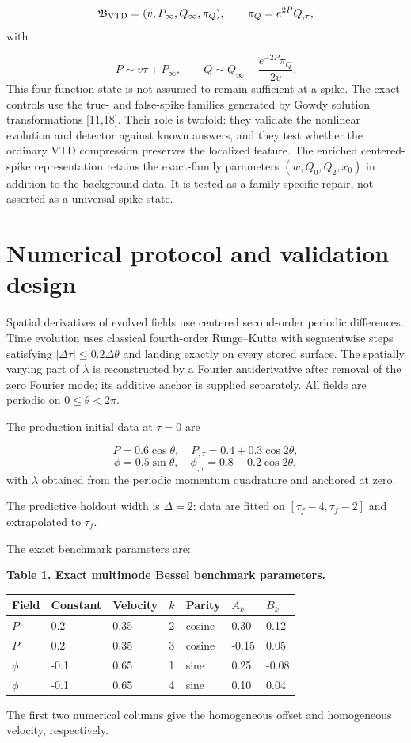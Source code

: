 \documentclass{iopjournal}
\begin{document}
\[
\mathfrak B_{\rm VTD}=(v,P_\infty,Q_\infty,\pi_Q),
\qquad \pi_Q=e^{2P}Q_{,\tau},
\]
with

\[
P\sim v\tau+P_\infty,
\qquad
Q\sim Q_\infty-\frac{e^{-2P}\pi_Q}{2v}.
\]
This four-function state is not assumed to remain sufficient at a spike. The exact controls use the true- and false-spike families generated by Gowdy solution transformations [11,18]. Their role is twofold: they validate the nonlinear evolution and detector against known answers, and they test whether the ordinary VTD compression preserves the localized feature. The enriched centered-spike representation retains the exact-family parameters $(w,Q_0,Q_2,x_0)$ in addition to the background data. It is tested as a family-specific repair, not asserted as a universal spike state.

\section{Numerical protocol and validation design}
Spatial derivatives of evolved fields use centered second-order periodic differences. Time evolution uses classical fourth-order Runge--Kutta with segmentwise steps satisfying $|\Delta\tau|\leq0.2\Delta\theta$ and landing exactly on every stored surface. The spatially varying part of $\lambda$ is reconstructed by a Fourier antiderivative after removal of the zero Fourier mode; its additive anchor is supplied separately. All fields are periodic on $0\leq\theta<2\pi$.

The production initial data at $\tau=0$ are

\[
P=0.6\cos\theta,\quad P_{,\tau}=0.4+0.3\cos2\theta,
\]
\[
\phi=0.5\sin\theta,\quad
\phi_{,\tau}=0.8-0.2\cos2\theta,
\]
with $\lambda$ obtained from the periodic momentum quadrature and anchored at zero.

The predictive holdout width is $\Delta=2$: data are fitted on $[\tau_f-4,\tau_f-2]$ and extrapolated to $\tau_f$.

The exact benchmark parameters are:

\textbf{Table 1. Exact multimode Bessel benchmark parameters.}

\begin{table}[H]
\centering
\small
\begin{tabularx}{\textwidth}{@{}lYYYYYY@{}}
\toprule
\textbf{Field} & \textbf{Constant} & \textbf{Velocity} & \textbf{$k$} & \textbf{Parity} & \textbf{$A_k$} & \textbf{$B_k$} \\
\midrule
$P$ & 0.2 & 0.35 & 2 & cosine & 0.30 & 0.12 \\
$P$ & 0.2 & 0.35 & 3 & cosine & -0.15 & 0.05 \\
$\phi$ & -0.1 & 0.65 & 1 & sine & 0.25 & -0.08 \\
$\phi$ & -0.1 & 0.65 & 4 & sine & 0.10 & 0.04 \\
\bottomrule
\end{tabularx}
\end{table}
The first two numerical columns give the homogeneous offset and homogeneous velocity, respectively.
\end{document}
